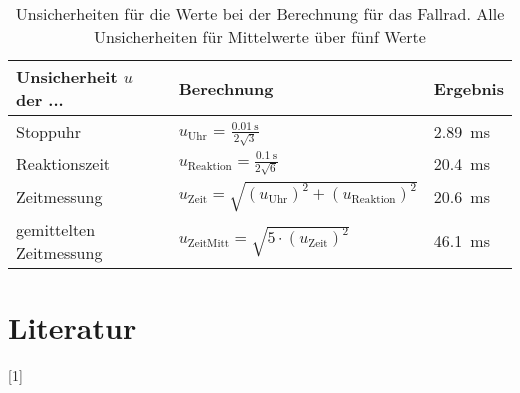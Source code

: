 \documentclass[11pt,a4paper,titlepage, ngerman]{article}
\begin{document}
	\begin{table}[ht]
		\centering
		\caption{Unsicherheiten für die Werte bei der Berechnung für das Fallrad. Alle Unsicherheiten für Mittelwerte über fünf Werte}
		\begin{tabular}{l|l|l}
			\hline
			{Unsicherheit $u$ der ...} & {Berechnung}  & {Ergebnis}\\
			\hline 
			{Stoppuhr} &  {$u_\text{Uhr}$ = $\frac{\SI{0,01}{\second}}{2\sqrt{3}}$} & {\SI{2,89}{\milli\second}} \\
			{Reaktionszeit} & {$u_\text{Reaktion} = \frac{\SI{0,1}{\second}}{2\sqrt{6}}$} & {\SI{20,4}{\milli\second}} \\
			{Zeitmessung} & {$u_\text{Zeit} = \sqrt{\left( u_\text{Uhr}\right) ^2+\left( u_\text{Reaktion}\right) ^2}$} & {\SI{20,6}{\milli\second}} \\
			{gemittelten Zeitmessung} & {$u_\text{ZeitMitt} = \sqrt{5\cdot\left(u_\text{Zeit}\right) ^2}$} & {\SI{46,1}{\milli\second}} \\
			
			\hline
		\end{tabular}
	\end{table}
	
	\section*{Literatur}
	
	[1] 
	
\end{document}
